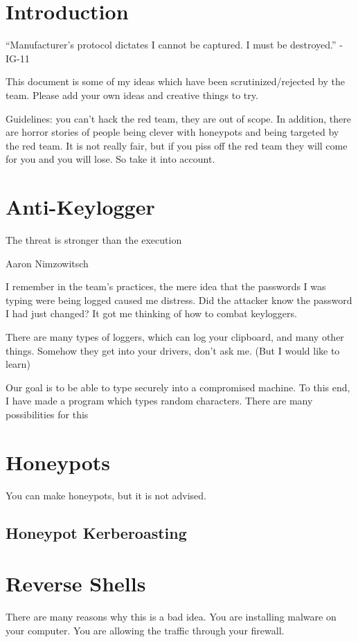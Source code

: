 \documentclass{article}
\begin{document}
\graphicspath{ {./Images/} }
\tableofcontents

\section{Introduction}
“Manufacturer's protocol dictates I cannot be captured. I must be destroyed.” - IG-11

This document is some of my ideas which have been scrutinized/rejected by the team. 
Please add your own ideas and creative things to try.

Guidelines: you can't hack the red team, they are out of scope.
In addition, there are horror stories of people being clever with honeypots and being targeted by the red team.
It is not really fair, but if you piss off the red team they will come for you and you will lose. So take it into account.

\section{Anti-Keylogger}
\epigraph{The threat is stronger than the execution}{Aaron Nimzowitsch}

I remember in the team's practices, the mere idea that the passwords I was typing were being logged caused me distress. 
Did the attacker know the password I had just changed? It got me thinking of how to combat keyloggers.

There are many types of loggers, which can log your clipboard, and many other things. Somehow they get into your drivers, don't ask me. (But I would like to learn)

Our goal is to be able to type securely into a compromised machine. To this end, I have made a program which types random characters. There are many possibilities for this

\section{Honeypots}
You can make honeypots, but it is not advised.

\subsection{Honeypot Kerberoasting}

\section{Reverse Shells}
There are many reasons why this is a bad idea. You are installing malware on your computer. 
You are allowing the traffic through your firewall.
\end{document}
